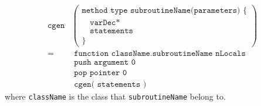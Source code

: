 \documentclass[a4paper]{book}
\begin{document}
\begin{align*}
    \texttt{cgen} &
    \left(
        \begin{array}{l}
            \texttt{method type subroutineName(parameters) \{ } \\
            \texttt{~ ~varDec*} \\
            \texttt{~ ~statements} \\
            \texttt{\} }
        \end{array}
    \right) \\
    = & \texttt{ function className.subroutineName nLocals} \\
      & \texttt{ push argument 0} \\
      & \texttt{ pop pointer 0} \\
      & \texttt{ cgen( statements )}
\end{align*}
where \texttt{className} is the class that \texttt{subroutineName} belong to.
\end{document}
